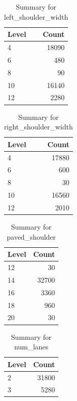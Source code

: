 \begin{table}[ht]
\centering
\begin{tabular}{lr}
  \hline
Level & Count \\ 
  \hline
4 & 18090 \\ 
  6 & 480 \\ 
  8 &  90 \\ 
  10 & 16140 \\ 
  12 & 2280 \\ 
   \hline
\end{tabular}
\caption{Summary for left_shoulder_width} 
\label{tab: left_shoulder_width}
\end{table}
\begin{table}[ht]
\centering
\begin{tabular}{lr}
  \hline
Level & Count \\ 
  \hline
4 & 17880 \\ 
  6 & 600 \\ 
  8 &  30 \\ 
  10 & 16560 \\ 
  12 & 2010 \\ 
   \hline
\end{tabular}
\caption{Summary for right_shoulder_width} 
\label{tab: right_shoulder_width}
\end{table}
\begin{table}[ht]
\centering
\begin{tabular}{lr}
  \hline
Level & Count \\ 
  \hline
12 &  30 \\ 
  14 & 32700 \\ 
  16 & 3360 \\ 
  18 & 960 \\ 
  20 &  30 \\ 
   \hline
\end{tabular}
\caption{Summary for paved_shoulder} 
\label{tab: paved_shoulder}
\end{table}
\begin{table}[ht]
\centering
\begin{tabular}{lr}
  \hline
Level & Count \\ 
  \hline
2 & 31800 \\ 
  3 & 5280 \\ 
   \hline
\end{tabular}
\caption{Summary for num_lanes} 
\label{tab: num_lanes}
\end{table}
